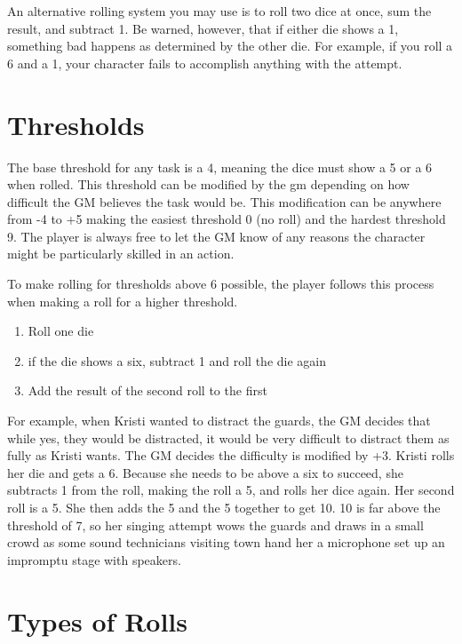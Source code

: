 \begin{flushleft}
An alternative rolling system you may use is to roll two dice at once, sum the
result, and subtract 1. Be warned, however, that if either die shows a 1,
something bad happens as determined by the other die. For example, if you
roll a 6 and a 1, your character fails to accomplish anything with the attempt.

\section*{Thresholds}
The base threshold for any task is a 4, meaning  the dice must show a 5 or a 6
when rolled. This threshold can be modified by the gm depending on how
difficult the GM believes the task would be. This modification can be anywhere
from -4 to +5 making the easiest threshold 0 (no roll) and the hardest
threshold 9. The player is always free to let the GM know of any reasons the
character might be particularly skilled in an action.

To make rolling for thresholds above 6 possible, the player follows this
process when making a roll for a higher threshold.

\begin{enumerate}
    \item{Roll one die}
    \item{if the die shows a six, subtract 1 and roll the die again}
    \item{Add the result of the second roll to the first}
\end{enumerate}

For example, when Kristi wanted to distract the guards, the GM decides that
while yes, they would be distracted, it would be very difficult to distract
them as fully as Kristi wants. The GM decides the difficulty is modified by
+3. Kristi rolls her die and gets a 6. Because she needs to be above a six
to succeed, she subtracts 1 from the roll, making the roll a 5, and rolls her
dice again. Her second roll is a 5. She then adds the 5 and the 5 together to
get 10. 10 is far above the threshold of 7, so her singing attempt wows the
guards and draws in a small crowd as some sound technicians visiting town hand
her a microphone set up an impromptu stage with speakers.

\section*{Types of Rolls}


\end{flushleft}
